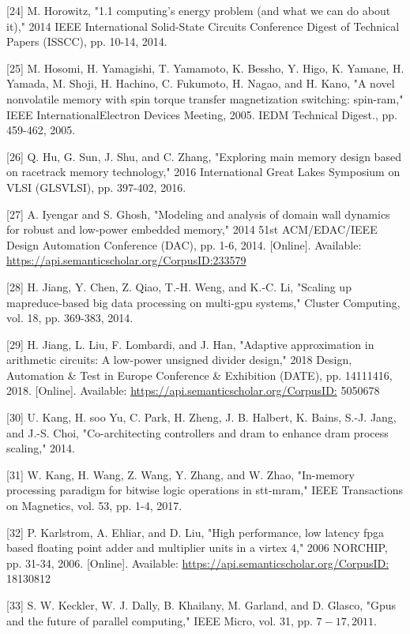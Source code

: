 \documentclass[10pt]{article}
\begin{document}
[24] M. Horowitz, "1.1 computing's energy problem (and what we can do about it)," 2014 IEEE International Solid-State Circuits Conference Digest of Technical Papers (ISSCC), pp. 10-14, 2014.

[25] M. Hosomi, H. Yamagishi, T. Yamamoto, K. Bessho, Y. Higo, K. Yamane, H. Yamada, M. Shoji, H. Hachino, C. Fukumoto, H. Nagao, and H. Kano, "A novel nonvolatile memory with spin torque transfer magnetization switching: spin-ram," IEEE InternationalElectron Devices Meeting, 2005. IEDM Technical Digest., pp. 459-462, 2005.

[26] Q. Hu, G. Sun, J. Shu, and C. Zhang, "Exploring main memory design based on racetrack memory technology," 2016 International Great Lakes Symposium on VLSI (GLSVLSI), pp. 397-402, 2016.

[27] A. Iyengar and S. Ghosh, "Modeling and analysis of domain wall dynamics for robust and low-power embedded memory," 2014 51st ACM/EDAC/IEEE Design Automation Conference (DAC), pp. 1-6, 2014. [Online]. Available: \href{https://api.semanticscholar.org/CorpusID:233579}{https://api.semanticscholar.org/CorpusID:233579}

[28] H. Jiang, Y. Chen, Z. Qiao, T.-H. Weng, and K.-C. Li, "Scaling up mapreduce-based big data processing on multi-gpu systems," Cluster Computing, vol. 18, pp. 369-383, 2014.

[29] H. Jiang, L. Liu, F. Lombardi, and J. Han, "Adaptive approximation in arithmetic circuits: A low-power unsigned divider design," 2018 Design, Automation \& Test in Europe Conference \& Exhibition (DATE), pp. 14111416, 2018. [Online]. Available: \href{https://api.semanticscholar.org/CorpusID:}{https://api.semanticscholar.org/CorpusID:} 5050678

[30] U. Kang, H. soo Yu, C. Park, H. Zheng, J. B. Halbert, K. Bains, S.-J. Jang, and J.-S. Choi, "Co-architecting controllers and dram to enhance dram process scaling," 2014.

[31] W. Kang, H. Wang, Z. Wang, Y. Zhang, and W. Zhao, "In-memory processing paradigm for bitwise logic operations in stt-mram," IEEE Transactions on Magnetics, vol. 53, pp. 1-4, 2017.

[32] P. Karlstrom, A. Ehliar, and D. Liu, "High performance, low latency fpga based floating point adder and multiplier units in a virtex 4," 2006 NORCHIP, pp. 31-34, 2006. [Online]. Available: \href{https://api.semanticscholar.org/CorpusID:}{https://api.semanticscholar.org/CorpusID:} 18130812

[33] S. W. Keckler, W. J. Dally, B. Khailany, M. Garland, and D. Glasco, "Gpus and the future of parallel computing," IEEE Micro, vol. 31, pp. $7-17,2011$.
\end{document}
